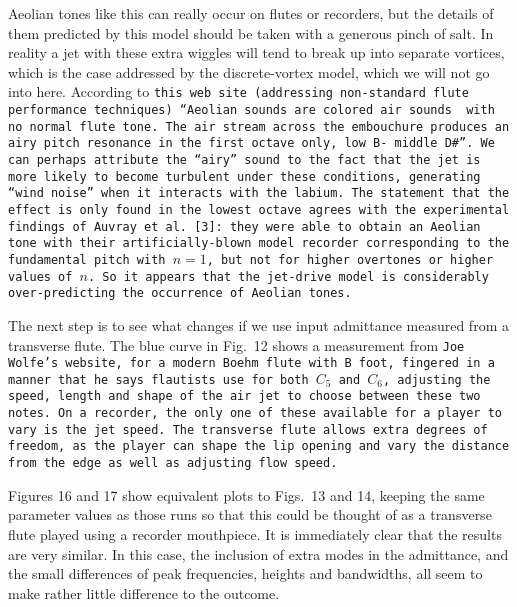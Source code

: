   Aeolian tones like this can really occur on flutes or recorders, but the 
  details of them predicted by this model should be taken with a generous pinch 
  of salt. In reality a jet with these extra wiggles will tend to break up into 
  separate vortices, which is the case addressed by the discrete-vortex model, 
  which we will not go into here. According to \tt{}this web site\rm{} 
  (addressing non-standard flute performance techniques) “Aeolian sounds are 
  colored air sounds ~with no normal flute tone. The~air stream across the 
  embouchure produces an airy pitch resonance in the~first octave~only, low B- 
  middle D\#”. We can perhaps attribute the ``airy'' sound to the fact that the 
  jet is more likely to become turbulent under these conditions, generating 
  ``wind noise'' when it interacts with the labium. The statement that the 
  effect is only found in the lowest octave agrees with the experimental 
  findings of Auvray et al. [3]: they were able to obtain an Aeolian tone with 
  their artificially-blown model recorder corresponding to the fundamental 
  pitch with $n=1$, but not for higher overtones or higher values of $n$. So it 
  appears that the jet-drive model is considerably over-predicting the 
  occurrence of Aeolian tones. 

  The next step is to see what changes if we use input admittance measured from 
  a transverse flute. The blue curve in Fig.\ 12 shows a measurement from 
  \tt{}Joe Wolfe’s website\rm{}, for a modern Boehm flute with B foot, fingered 
  in a manner that he says flautists use for both $C_5$ and $C_6$, adjusting 
  the speed, length and shape of the air jet to choose between these two notes. 
  On a recorder, the only one of these available for a player to vary is the 
  jet speed. The transverse flute allows extra degrees of freedom, as the 
  player can shape the lip opening and vary the distance from the edge as well 
  as adjusting flow speed. 

  Figures 16 and 17 show equivalent plots to Figs.\ 13 and 14, keeping the same 
  parameter values as those runs so that this could be thought of as a 
  transverse flute played using a recorder mouthpiece. It is immediately clear 
  that the results are very similar. In this case, the inclusion of extra modes 
  in the admittance, and the small differences of peak frequencies, heights and 
  bandwidths, all seem to make rather little difference to the outcome. 


